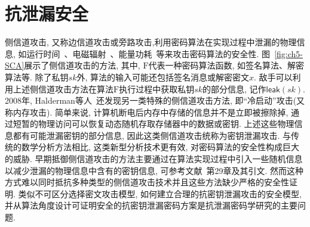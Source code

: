 \newcommand{\LF}{\text{LF}}

\section{抗泄漏安全}

侧信道攻击, 又称边信道攻击或旁路攻击,利用密码算法在实现过程中泄漏的物理信息, 如运行时间~\cite{Kocher-CRYPTO-1996}、电磁辐射~\cite{GMO-CHES-2001}、能量功耗~\cite{Kocher-CRYPTO-1999}等来攻击密码算法的安全性. 图~\ref{fig:ch5-SCA}展示了侧信道攻击的方法, 其中, $\text{F}$代表一种密码算法函数, 如签名算法、解密算法等. 除了私钥$sk$外, 算法的输入可能还包括签名消息或解密密文$x$. 敌手可以利用上述侧信道攻击方法在算法$\text{F}$执行过程中获取私钥$sk$的部分信息, 记作$\mathsf{leak}(sk)$. 2008年, Halderman等人~\cite{Halderman-USENIX-Security-2008}还发现另一类特殊的侧信道攻击方法, 即``冷启动''攻击(又称内存攻击). 简单来说, 计算机断电后内存中存储的信息并不是立即被擦除掉, 通过短暂的物理访问可以恢复动态随机存取存储器中的数据或密钥. 上述这些物理信息都有可能泄漏密钥的部分信息, 因此这类侧信道攻击统称为密钥泄漏攻击. 与传统的数学分析方法相比, 这类新型分析技术更有效, 对密码算法的安全性构成巨大的威胁. 早期抵御侧信道攻击的方法主要通过在算法实现过程中引入一些随机信息以减少泄漏的物理信息中含有的密钥信息, 可参考文献~\cite{EHCC-Book-2005}第29章及其引文. 然而这种方式难以同时抵抗多种类型的侧信道攻击技术并且这些方法缺少严格的安全性证明. 类似不可区分选择密文攻击模型, 如何建立合理的抗密钥泄漏攻击的安全模型, 并从算法角度设计可证明安全的抗密钥泄漏密码方案是抗泄漏密码学研究的主要问题.

